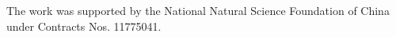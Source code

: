 \documentclass[%
reprint,
superscriptaddress,
showpacs,preprintnumbers,
 amsmath,amssymb,
 aps,
prd,
]{revtex4-1}
\begin{document}
\begin{acknowledgments}

The work was supported by the National Natural Science Foundation of China under Contracts Nos. 11775041.

\end{acknowledgments}




\end{document}
